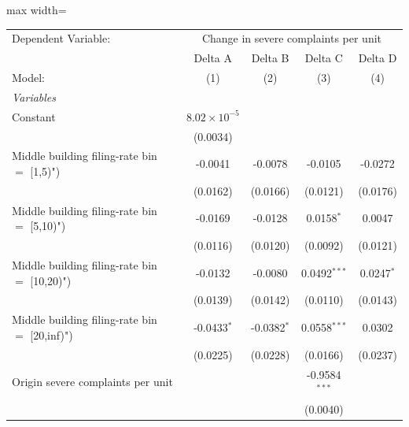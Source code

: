\documentclass[
  11pt,
]{article}
\begin{document}
\begin{adjustbox}{max width=\textwidth}
\begingroup
\centering
\begin{tabular}{lcccc}
   \tabularnewline \midrule \midrule
   Dependent Variable: & \multicolumn{4}{c}{Change in severe complaints per unit}\\
                                                  & Delta A               & Delta B       & Delta C         & Delta D \\   
   Model:                                         & (1)                   & (2)           & (3)             & (4)\\  
   \midrule
   \emph{Variables}\\
   Constant                                       & $8.02\times 10^{-5}$  &               &                 &   \\   
                                                  & (0.0034)              &               &                 &   \\   
   Middle building filing-rate bin $=$ [1,5)")    & -0.0041               & -0.0078       & -0.0105         & -0.0272\\   
                                                  & (0.0162)              & (0.0166)      & (0.0121)        & (0.0176)\\   
   Middle building filing-rate bin $=$ [5,10)")   & -0.0169               & -0.0128       & 0.0158$^{*}$    & 0.0047\\   
                                                  & (0.0116)              & (0.0120)      & (0.0092)        & (0.0121)\\   
   Middle building filing-rate bin $=$ [10,20)")  & -0.0132               & -0.0080       & 0.0492$^{***}$  & 0.0247$^{*}$\\   
                                                  & (0.0139)              & (0.0142)      & (0.0110)        & (0.0143)\\   
   Middle building filing-rate bin $=$ [20,inf)") & -0.0433$^{*}$         & -0.0382$^{*}$ & 0.0558$^{***}$  & 0.0302\\   
                                                  & (0.0225)              & (0.0228)      & (0.0166)        & (0.0237)\\   
   Origin severe complaints per unit              &                       &               & -0.9584$^{***}$ &   \\   
                                                  &                       &               & (0.0040)        &   \\   

\end{tabular}
\end{adjustbox}
\end{document}

